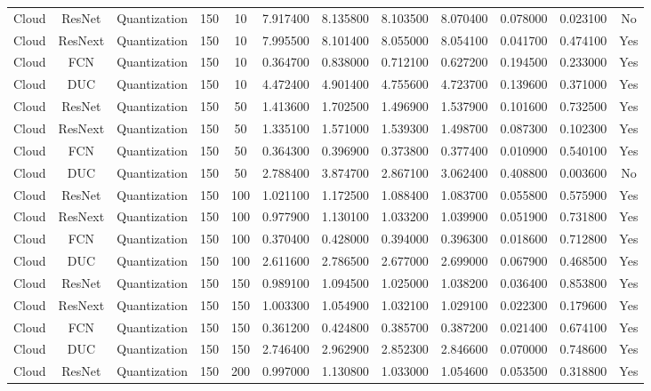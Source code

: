 \begin{tabular}{|c||c||c||c||c||c||c||c||c||c||c||c|}
Cloud & ResNet & Quantization & 150 & 10 & 7.917400 & 8.135800 & 8.103500 & 8.070400 & 0.078000 & 0.023100 & No \\
Cloud & ResNext & Quantization & 150 & 10 & 7.995500 & 8.101400 & 8.055000 & 8.054100 & 0.041700 & 0.474100 & Yes \\
Cloud & FCN & Quantization & 150 & 10 & 0.364700 & 0.838000 & 0.712100 & 0.627200 & 0.194500 & 0.233000 & Yes \\
Cloud & DUC & Quantization & 150 & 10 & 4.472400 & 4.901400 & 4.755600 & 4.723700 & 0.139600 & 0.371000 & Yes \\
Cloud & ResNet & Quantization & 150 & 50 & 1.413600 & 1.702500 & 1.496900 & 1.537900 & 0.101600 & 0.732500 & Yes \\
Cloud & ResNext & Quantization & 150 & 50 & 1.335100 & 1.571000 & 1.539300 & 1.498700 & 0.087300 & 0.102300 & Yes \\
Cloud & FCN & Quantization & 150 & 50 & 0.364300 & 0.396900 & 0.373800 & 0.377400 & 0.010900 & 0.540100 & Yes \\
Cloud & DUC & Quantization & 150 & 50 & 2.788400 & 3.874700 & 2.867100 & 3.062400 & 0.408800 & 0.003600 & No \\
Cloud & ResNet & Quantization & 150 & 100 & 1.021100 & 1.172500 & 1.088400 & 1.083700 & 0.055800 & 0.575900 & Yes \\
Cloud & ResNext & Quantization & 150 & 100 & 0.977900 & 1.130100 & 1.033200 & 1.039900 & 0.051900 & 0.731800 & Yes \\
Cloud & FCN & Quantization & 150 & 100 & 0.370400 & 0.428000 & 0.394000 & 0.396300 & 0.018600 & 0.712800 & Yes \\
Cloud & DUC & Quantization & 150 & 100 & 2.611600 & 2.786500 & 2.677000 & 2.699000 & 0.067900 & 0.468500 & Yes \\
Cloud & ResNet & Quantization & 150 & 150 & 0.989100 & 1.094500 & 1.025000 & 1.038200 & 0.036400 & 0.853800 & Yes \\
Cloud & ResNext & Quantization & 150 & 150 & 1.003300 & 1.054900 & 1.032100 & 1.029100 & 0.022300 & 0.179600 & Yes \\
Cloud & FCN & Quantization & 150 & 150 & 0.361200 & 0.424800 & 0.385700 & 0.387200 & 0.021400 & 0.674100 & Yes \\
Cloud & DUC & Quantization & 150 & 150 & 2.746400 & 2.962900 & 2.852300 & 2.846600 & 0.070000 & 0.748600 & Yes \\
Cloud & ResNet & Quantization & 150 & 200 & 0.997000 & 1.130800 & 1.033000 & 1.054600 & 0.053500 & 0.318800 & Yes \\

\end{tabular}

